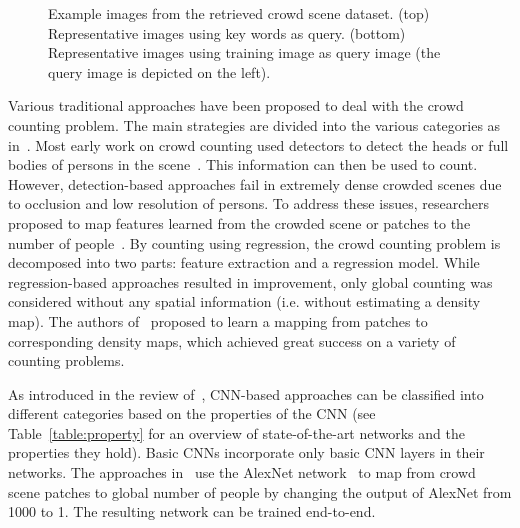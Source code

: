 \documentclass[10pt,twocolumn,letterpaper]{article}
\begin{document}
\begin{figure*}[tpb]
\centering
{}
\caption{Example images from the retrieved crowd scene dataset. (top)
  Representative images using key words as query. (bottom)
  Representative images using training image as query image (the query
  image is depicted on the left).}
  \label{fig:data1}
\end{figure*}

Various traditional approaches have been proposed to deal with the
crowd counting problem. The main strategies are divided into the
various categories as in~\cite{loy2013crowd}. Most early work on crowd
counting used detectors to detect the heads or full bodies of persons
in the scene~\cite{dollar2012pedestrian,li2008estimating}. This
information can then be used to count.  However, detection-based
approaches fail in extremely dense crowded scenes due to occlusion and
low resolution of persons. To address these issues, researchers
proposed to map features learned from the crowded scene or patches to
the number of people~\cite{chan2009bayesian,chen2012feature}. By
counting using regression, the crowd counting problem is decomposed
into two parts: feature extraction and a regression model. While
regression-based approaches resulted in improvement, only global
counting was considered without any spatial information (i.e. without
estimating a density map). The authors of~\cite{lempitsky2010learning}
proposed to learn a mapping from  patches to corresponding
density maps, which achieved great success on a variety of counting
problems.

As introduced in the review of~\cite{sindagi2017survey}, CNN-based
approaches can be classified into different categories based on the
properties of the CNN (see Table~\ref{table:property} for an overview
of state-of-the-art networks and the properties they hold). Basic CNNs
incorporate only basic CNN layers in their networks. The approaches
in~\cite{fu2015fast,wang2015deep} use the AlexNet
network~\cite{krizhevsky2012imagenet} to map from crowd scene patches
to global number of people by changing the output of AlexNet from 1000
to 1. The resulting network can be trained end-to-end.
\end{document}
